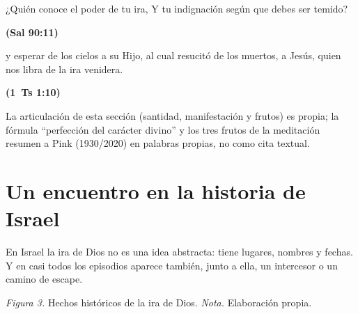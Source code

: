 \documentclass[11pt,letterpaper]{article}
\newcommand{\fuente}[1]{\par\hfill{\upshape\bfseries\small\textcolor{azul}{#1}}}
\begin{document}
\begin{cita}¿Quién conoce el poder de tu ira, Y tu indignación según que debes ser temido?\fuente{(Sal 90:11)}\end{cita}

\begin{cita}y esperar de los cielos a su Hijo, al cual resucitó de los muertos, a Jesús, quien nos libra de la ira venidera.\fuente{(1~Ts 1:10)}\end{cita}

\begin{nota}[Precisión]
La articulación de esta sección (santidad, manifestación y frutos) es propia; la fórmula ``perfección del carácter divino'' y los tres frutos de la meditación resumen a Pink (1930/2020) en palabras propias, no como cita textual.
\end{nota}

\section{Un encuentro en la historia de Israel}

En Israel la ira de Dios no es una idea abstracta: tiene lugares, nombres y fechas. Y en casi todos los episodios aparece también, junto a ella, un intercesor o un camino de escape.

\begin{center}
\par
{\footnotesize\color{gris}\textit{Figura 3.} Hechos históricos de la ira de Dios. \textit{Nota.} Elaboración propia.}
\end{center}
\end{document}
